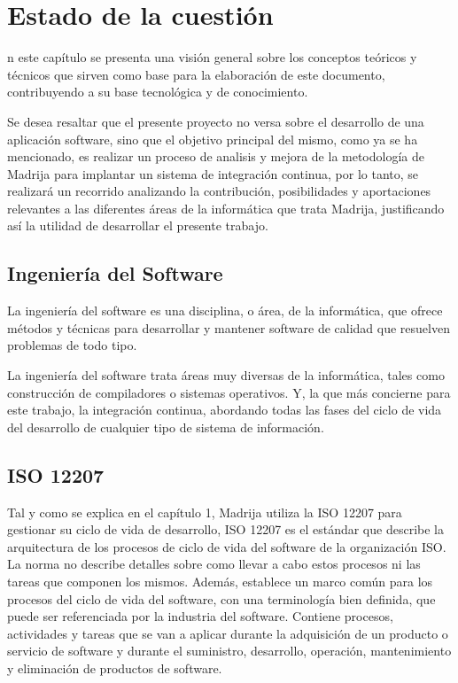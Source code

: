 \chapter{Estado de la cuestión}
\label{chap:antecedentes}

n este capítulo se presenta una visión general sobre los conceptos teóricos y técnicos que sirven como base para la elaboración de este documento, contribuyendo a su base tecnológica y de conocimiento.

Se desea resaltar que el presente proyecto no versa sobre el desarrollo de una aplicación software, sino que el objetivo principal del mismo, como ya se ha mencionado, es realizar un proceso de analisis y mejora de la metodología de \ac{Madrija} para implantar un sistema de integración continua, por lo tanto, se realizará un recorrido analizando la contribución, posibilidades y aportaciones relevantes a las diferentes áreas de la informática que trata \ac{Madrija}, justificando así la utilidad de desarrollar el presente trabajo.

\section{Ingeniería del Software}

La ingeniería del software es una disciplina, o área, de la informática\cite{Pressman1988}, que ofrece métodos y técnicas para desarrollar y mantener software de calidad que resuelven problemas de todo tipo.

La ingeniería del software trata áreas muy diversas de la informática, tales como construcción de compiladores o sistemas operativos. Y, la que más concierne para este trabajo, la integración continua, abordando todas las fases del ciclo de vida del desarrollo de cualquier tipo de sistema de información.

\section{ISO 12207}
Tal y como se explica en el capítulo 1, \ac{Madrija} utiliza la \ac{ISO} 12207\cite{ISO_12207} para gestionar su ciclo de vida de desarrollo, \ac{ISO} 12207 es el estándar que describe la arquitectura de los procesos de ciclo de vida del software de la organización \ac{ISO}. La norma no describe detalles sobre como llevar a cabo estos procesos ni las tareas que componen los mismos. Además, establece un marco común para los procesos del ciclo de vida del software, con una terminología bien definida, que puede ser referenciada por la industria del software. Contiene procesos, actividades y tareas que se van a aplicar durante la adquisición de un producto o servicio de software y durante el suministro, desarrollo, operación, mantenimiento y eliminación de productos de software.

